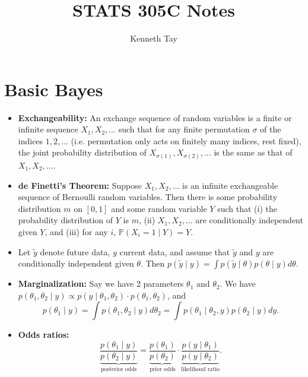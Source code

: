 \documentclass[twoside]{article}
\newcommand{\dis}{\displaystyle}
\newcommand\bbP{\mathbb{P}}
\newcommand\sg{\sigma}
\def\t{\theta}
\begin{document}
\title{STATS 305C Notes}
\author{Kenneth Tay}
\date{\vspace{-3ex}}
\maketitle

\section{Basic Bayes}
\begin{itemize}
\item \textbf{Exchangeability:} An exchange sequence of random variables is a finite or infinite sequence $X_1, X_2, \dots$ such that for any finite permutation $\sg$ of the indices $1, 2, \dots$ (i.e. permutation only acts on finitely many indices, rest fixed), the joint probability distribution of $X_{\sg(1)}, X_{\sg(2)}, \dots$ is the same as that of $X_1, X_2, \dots$.

\item \textbf{de Finetti's Theorem:} Suppose $X_1, X_2, \dots$ is an infinite exchangeable sequence of Bernoulli random variables. Then there is some probability distribution $m$ on $[0,1]$ and some random variable $Y$ such that (i) the probability distribution of $Y$ is $m$, (ii) $X_1, X_2, \dots$ are conditionally independent given $Y$, and (iii) for any $i$, $\bbP (X_i = 1 \mid Y) = Y$.

\item Let $\tilde{y}$ denote future data, $y$ current data, and assume that $\tilde{y}$ and $y$ are conditionally independent given $\t$. Then $p(\tilde{y} \mid y) = \dis\int p(\tilde{y} \mid \t) p (\t \mid y) d\t$.

\item \textbf{Marginalization:} Say we have 2 parameters $\t_1$ and $\t_2$. We have $p(\t_1, \t_2 \mid y) \propto p(y \mid \t_1, \t_2) \cdot p(\t_1, \t_2)$, and
\begin{equation*}
p(\t_1 \mid y) = \int p(\t_1, \t_2 \mid y) d\t_2 = \int p(\t_1 \mid \t_2, y) p(\t_2 \mid y) dy.
\end{equation*}

\item \textbf{Odds ratios:}
\begin{equation*}
\underbrace{\frac{p(\t_1 \mid y)}{p(\t_2 \mid y)}}_{\text{posterior odds}} = \underbrace{\frac{p(\t_1)}{p(\t_2)}}_{\text{prior odds}} \cdot \underbrace{\frac{p(y \mid \t_1)}{p(y \mid \t_2)}}_{\text{likelihood ratio}}.
\end{equation*}


\end{itemize}
\end{document}

